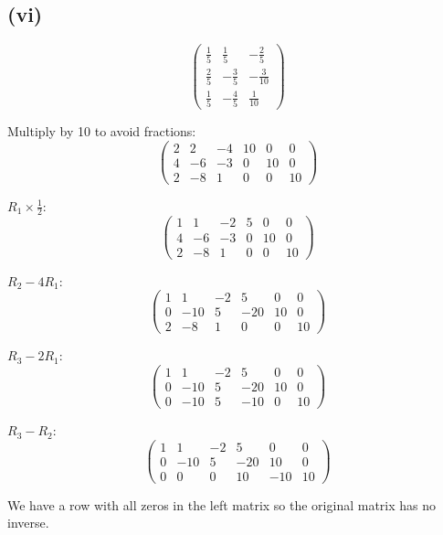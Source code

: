 \subsection*{(vi)}
\[
	\begin{pmatrix}
		\frac{1}{5} & \frac{1}{5}  & -\frac{2}{5}  \\
		\frac{2}{5} & -\frac{3}{5} & -\frac{3}{10} \\
		\frac{1}{5} & -\frac{4}{5} & \frac{1}{10}
	\end{pmatrix}
\]

Multiply by 10 to avoid fractions:
\[
	\left(\begin{array}{ccc|ccc}
			2 & 2  & -4 & 10 & 0  & 0  \\
			4 & -6 & -3 & 0  & 10 & 0  \\
			2 & -8 & 1  & 0  & 0  & 10
		\end{array}\right)
\]

$R_1 \times \frac{1}{2}$:
\[
	\left(\begin{array}{ccc|ccc}
			1 & 1  & -2 & 5 & 0  & 0  \\
			4 & -6 & -3 & 0 & 10 & 0  \\
			2 & -8 & 1  & 0 & 0  & 10
		\end{array}\right)
\]

$R_2 - 4R_1$:
\[
	\left(\begin{array}{ccc|ccc}
			1 & 1   & -2 & 5   & 0  & 0  \\
			0 & -10 & 5  & -20 & 10 & 0  \\
			2 & -8  & 1  & 0   & 0  & 10
		\end{array}\right)
\]

$R_3 - 2R_1$:
\[
	\left(\begin{array}{ccc|ccc}
			1 & 1   & -2 & 5   & 0  & 0  \\
			0 & -10 & 5  & -20 & 10 & 0  \\
			0 & -10 & 5  & -10 & 0  & 10
		\end{array}\right)
\]

$R_3 - R_2$:
\[
	\left(\begin{array}{ccc|ccc}
			1 & 1   & -2 & 5   & 0  & 0  \\
			0 & -10 & 5  & -20 & 10 & 0  \\
			0 & 0   & 0  & 10  & -10 & 10
		\end{array}\right)
\]

We have a row with all zeros in the left matrix so the original matrix has no inverse.